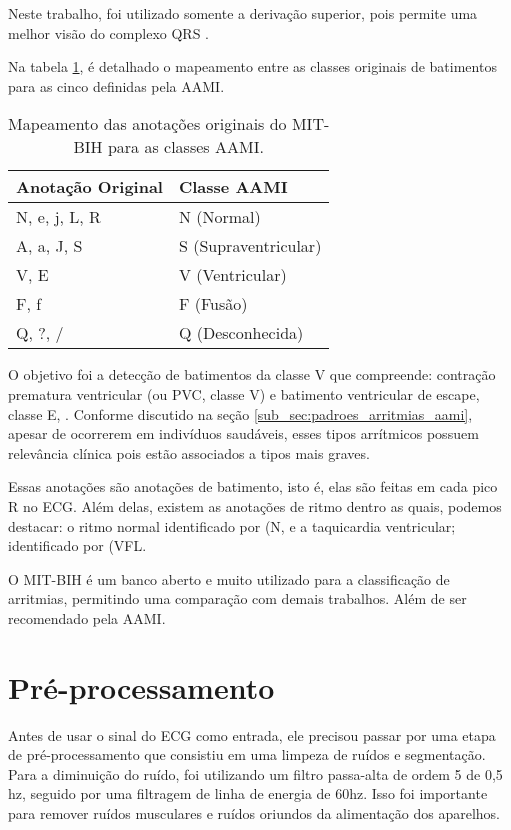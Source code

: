 Neste trabalho, foi utilizado somente a derivação superior, pois permite uma melhor visão do complexo QRS \cite{physionet_annotations}.

Na tabela \ref{tab:mapeamento_classes}, é detalhado o mapeamento entre as classes originais de batimentos para as cinco definidas pela AAMI.

\begin{table}[H]
\centering
\caption{Mapeamento das anotações originais do MIT-BIH para as classes AAMI.}
\label{tab:mapeamento_classes}
\begin{tabular}{ll}
\hline
\textbf{Anotação Original} & \textbf{Classe AAMI} \\
\hline
N, e, j, L, R & N (Normal) \\
A, a, J, S & S (Supraventricular) \\
V, E & V (Ventricular) \\
F, f & F (Fusão) \\
Q, ?, / & Q (Desconhecida) \\
\hline
\end{tabular}
\end{table}

O objetivo foi a detecção de batimentos da classe V que compreende: contração prematura ventricular (ou PVC, classe V) e batimento ventricular de escape, classe E, \cite{physionet_annotations}.
Conforme discutido na seção \ref{sub_sec:padroes_arritmias_aami}, apesar de ocorrerem em indivíduos saudáveis, esses tipos arrítmicos possuem relevância clínica pois estão associados a tipos mais graves.

Essas anotações são anotações de batimento, isto é, elas são feitas em cada pico R no ECG. Além delas, existem as anotações de ritmo dentro as quais, podemos destacar: o ritmo normal identificado por (N,
e a taquicardia ventricular; identificado por (VFL.

O MIT-BIH é um banco aberto e muito utilizado para a classificação de arritmias, permitindo uma comparação com demais trabalhos.
Além de ser recomendado pela AAMI.

\section{Pré-processamento}
\label{sec:pre_process}

Antes de usar o sinal do ECG como entrada, ele precisou passar por uma etapa de pré-processamento que consistiu em uma limpeza de ruídos e segmentação.
Para a diminuição do ruído, foi utilizando um filtro passa-alta de ordem 5 de 0,5 hz, seguido por uma filtragem de linha de energia de 60hz. 
Isso foi importante para remover ruídos musculares e ruídos oriundos da alimentação dos aparelhos. 

